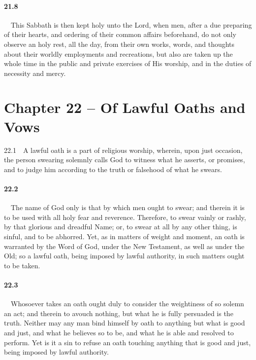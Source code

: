 \paragraph{21.8}\ \ This Sabbath is then kept holy unto the Lord, when men, after a due preparing of their hearts, and ordering of their common affairs beforehand, do not only observe an holy rest, all the day, from their own works, words, and thoughts about their worldly employments and recreations, but also are taken up the whole time in the public and private exercises of His worship, and in the duties of necessity and mercy.  

\section{Chapter 22 -- Of Lawful Oaths and Vows} 22.1\ \ A lawful oath is a part of religious worship, wherein, upon just occasion, the person swearing solemnly calls God to witness what he asserts, or promises, and to judge him according to the truth or falsehood of what he swears.   
\bigskip
\paragraph{22.2}\ \ The name of God only is that by which men ought to swear; and therein it is to be used with all holy fear and reverence. Therefore, to swear vainly or rashly, by that glorious and dreadful Name; or, to swear at all by any other thing, is sinful, and to be abhorred. Yet, as in matters of weight and moment, an oath is warranted by the Word of God, under the New Testament, as well as under the Old; so a lawful oath, being imposed by lawful authority, in such matters ought to be taken.   
\bigskip
\paragraph{22.3}\ \ Whosoever takes an oath ought duly to consider the weightiness of so solemn an act; and therein to avouch nothing, but what he is fully persuaded is the truth. Neither may any man bind himself by oath to anything but what is good and just, and what he believes so to be, and what he is able and resolved to perform. Yet is it a sin to refuse an oath touching anything that is good and just, being imposed by lawful authority.   
\bigskip
